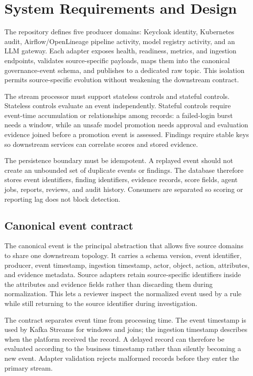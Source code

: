 \documentclass[conference]{IEEEtran}
\begin{document}
\section{System Requirements and Design}
The repository defines five producer domains: Keycloak identity, Kubernetes audit, Airflow/OpenLineage pipeline activity, model registry activity, and an LLM gateway. Each adapter exposes health, readiness, metrics, and ingestion endpoints, validates source-specific payloads, maps them into the canonical governance-event schema, and publishes to a dedicated raw topic. This isolation permits source-specific evolution without weakening the downstream contract.

The stream processor must support stateless controls and stateful controls. Stateless controls evaluate an event independently. Stateful controls require event-time accumulation or relationships among records: a failed-login burst needs a window, while an unsafe model promotion needs approval and evaluation evidence joined before a promotion event is assessed. Findings require stable keys so downstream services can correlate scores and stored evidence.

The persistence boundary must be idempotent. A replayed event should not create an unbounded set of duplicate events or findings. The database therefore stores event identifiers, finding identifiers, evidence records, score fields, agent jobs, reports, reviews, and audit history. Consumers are separated so scoring or reporting lag does not block detection.

\subsection{Canonical event contract}
The canonical event is the principal abstraction that allows five source domains to share one downstream topology. It carries a schema version, event identifier, producer, event timestamp, ingestion timestamp, actor, object, action, attributes, and evidence metadata. Source adapters retain source-specific identifiers inside the attributes and evidence fields rather than discarding them during normalization. This lets a reviewer inspect the normalized event used by a rule while still returning to the source identifier during investigation.

The contract separates event time from processing time. The event timestamp is used by Kafka Streams for windows and joins; the ingestion timestamp describes when the platform received the record. A delayed record can therefore be evaluated according to the business timestamp rather than silently becoming a new event. Adapter validation rejects malformed records before they enter the primary stream.
\end{document}
